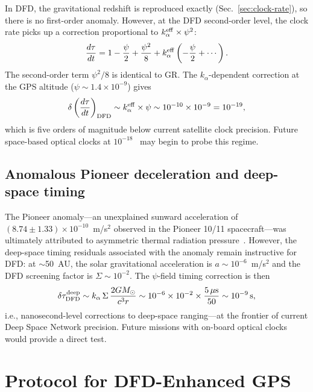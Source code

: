 \documentclass[aps,prd,twocolumn,superscriptaddress,nofootinbib]{revtex4-2}
\begin{document}
In DFD, the gravitational redshift is reproduced exactly
(Sec.~\ref{sec:clock-rate}), so there is no first-order anomaly.
However, at the DFD second-order level, the clock rate picks up a
correction proportional to $k_\alpha^{\rm eff}\times\psi^2$:
\begin{equation}\label{eq:second-order}
\frac{d\tau}{dt} = 1 - \frac{\psi}{2} + \frac{\psi^2}{8}
+ k_\alpha^{\rm eff}\left(-\frac{\psi}{2} + \cdots\right).
\end{equation}
The second-order term $\psi^2/8$ is identical to GR. The
$k_\alpha$-dependent correction at the GPS altitude
($\psi \sim 1.4\times10^{-9}$) gives
\begin{equation}
\delta\left(\frac{d\tau}{dt}\right)_{\rm DFD}
\sim k_\alpha^{\rm eff}\times\psi \sim 10^{-10}\times 10^{-9}
= 10^{-19},
\end{equation}
which is five orders of magnitude below current satellite clock
precision. Future space-based optical clocks at
$10^{-18}$~\cite{Kolkowitz2016} may begin to probe this regime.

\subsection{Anomalous Pioneer deceleration and
deep-space timing}\label{sec:pioneer}

The Pioneer anomaly---an unexplained sunward acceleration of
$(8.74 \pm 1.33)\times10^{-10}$~m/s$^2$ observed in the Pioneer 10/11
spacecraft---was ultimately attributed to asymmetric thermal radiation
pressure~\cite{Turyshev2012}. However, the deep-space timing residuals
associated with the anomaly remain instructive for DFD: at
$\sim$50~AU, the solar gravitational acceleration is $a \sim 10^{-6}$~m/s$^2$
and the DFD screening factor is $\Sigma \sim 10^{-2}$. The
$\psi$-field timing correction is then
\begin{equation}
\delta\tau_{\rm DFD}^{\rm deep} \sim k_\alpha\,\Sigma\,
\frac{2GM_\odot}{c^3 r} \sim 10^{-6}\times 10^{-2}\times
\frac{5\,\mu\mathrm{s}}{50} \sim 10^{-9}\,\mathrm{s},
\end{equation}
i.e., nanosecond-level corrections to deep-space ranging---at the
frontier of current Deep Space Network precision. Future missions with
on-board optical clocks would provide a direct test.

\section{Protocol for DFD-Enhanced GPS}\label{sec:protocol}
\end{document}
